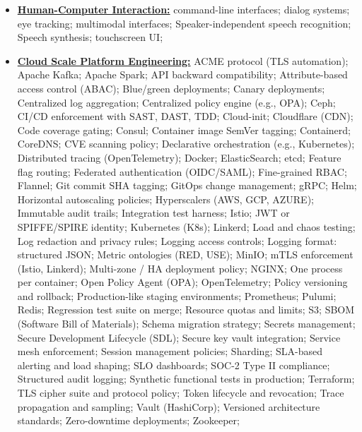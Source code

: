 \documentclass[letterpaper,11pt]{article}
\begin{document}
{\begin{itemize}[leftmargin=0.1in, label={}, itemsep=0pt, parsep=0pt, topsep=0pt, partopsep=0pt]
\item
\textbf{\underline{Human-Computer Interaction:}} \hspace{0pt}
command-line interfaces;
dialog systems;
eye tracking;
multimodal interfaces;
Speaker-independent speech recognition;
Speech synthesis;
touchscreen UI;
\item
\textbf{\underline{Cloud Scale Platform Engineering:}} \hspace{0pt}
ACME protocol (TLS automation);
Apache Kafka;
Apache Spark;
API backward compatibility;
Attribute-based access control (ABAC);
Blue/green deployments;
Canary deployments;
Centralized log aggregation;
Centralized policy engine (e.g., OPA);
Ceph;
CI/CD enforcement with SAST, DAST, TDD;
Cloud-init;
Cloudflare (CDN);
Code coverage gating;
Consul;
Container image SemVer tagging;
Containerd;
CoreDNS;
CVE scanning policy;
Declarative orchestration (e.g., Kubernetes);
Distributed tracing (OpenTelemetry);
Docker;
ElasticSearch;
etcd;
Feature flag routing;
Federated authentication (OIDC/SAML);
Fine-grained RBAC;
Flannel;
Git commit SHA tagging;
GitOps change management;
gRPC;
Helm;
Horizontal autoscaling policies;
Hyperscalers (AWS, GCP, AZURE);
Immutable audit trails;
Integration test harness;
Istio;
JWT or SPIFFE/SPIRE identity;
Kubernetes (K8s);
Linkerd;
Load and chaos testing;
Log redaction and privacy rules;
Logging access controls;
Logging format: structured JSON;
Metric ontologies (RED, USE);
MinIO;
mTLS enforcement (Istio, Linkerd);
Multi-zone / HA deployment policy;
NGINX;
One process per container;
Open Policy Agent (OPA);
OpenTelemetry;
Policy versioning and rollback;
Production-like staging environments;
Prometheus;
Pulumi;
Redis;
Regression test suite on merge;
Resource quotas and limits;
S3;
SBOM (Software Bill of Materials);
Schema migration strategy;
Secrets management;
Secure Development Lifecycle (SDL);
Secure key vault integration;
Service mesh enforcement;
Session management policies;
Sharding;
SLA-based alerting and load shaping;
SLO dashboards;
SOC-2 Type II compliance;
Structured audit logging;
Synthetic functional tests in production;
Terraform;
TLS cipher suite and protocol policy;
Token lifecycle and revocation;
Trace propagation and sampling;
Vault (HashiCorp);
Versioned architecture standards;
Zero-downtime deployments;
Zookeeper;

\end{itemize}
}
\end{document}
